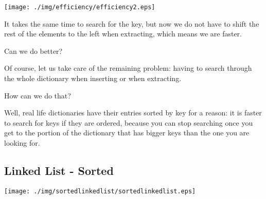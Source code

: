 \documentclass[a4paper, 9pt]{extarticle}
\begin{document}
\begin{multicols}{2}
\begin{center}
  \texttt{[image: ./img/efficiency/efficiency2.eps]}
\end{center}
\columnbreak

It takes the same time to search for the key, but now we do not have to shift the
rest of the elements to the left when extracting, which means we are faster.

Can we do better?

Of course, let us take care of the remaining problem: having to search through the
whole dictionary when inserting or when extracting.

How can we do that?

Well, real life dictionaries have their entries sorted by key for a reason: it
is faster to search for keys if they are ordered, because you can stop
searching once you get to the portion of the dictionary that has bigger keys
than the one you are looking for.

\end{multicols}


\newpage

\subsection{Linked List - Sorted}

\begin{center}
  \texttt{[image: ./img/sortedlinkedlist/sortedlinkedlist.eps]}
\end{center}
\end{document}

